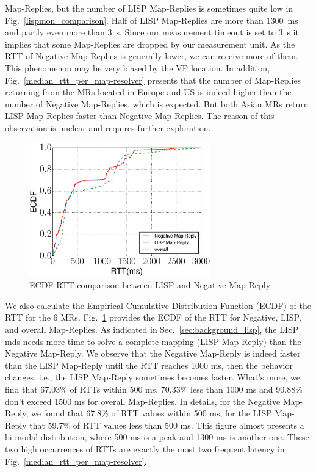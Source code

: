 Map-Replies, but the number of LISP Map-Replies is sometimes quite low in
Fig.~\ref{lispmon_comparison}. Half of LISP Map-Replies are more than 1300~ms
and partly even more than 3~s. Since our measurement timeout is set to 3~s
it implies that some Map-Replies are dropped by our measurement unit.  As the
RTT of Negative Map-Replies is generally lower, we can receive more of them. This
phenomenon may be very biased by the VP location. %
In addition, Fig.~\ref{median_rtt_per_map-resolver} presents that the number of
Map-Replies returning from the MRs  located in Europe and US is indeed higher
than the number of Negative Map-Replies, which is expected. But both Asian MRs
return LISP Map-Replies faster than Negative Map-Replies. The reason of this 
observation is unclear and requires further exploration.

\begin{figure}[!t]
        \centering
        \includegraphics[width=0.7\textwidth]{Pics/ecdf_of_RTT.eps}
        \caption{ECDF RTT comparison between LISP and Negative Map-Reply}
        \label{ecdf_rtt_lisp_negative}
\end{figure}
We also calculate the Empirical Cumulative Distribution Function (ECDF) of the
RTT for the 6 MRs. Fig.~\ref{ecdf_rtt_lisp_negative} provides the ECDF of the
RTT for Negative, LISP, and overall Map-Replies. As indicated in
Sec.~\ref{sec:background_lisp}, the LISP \acrshort{mds} needs more time to solve a
complete mapping (LISP Map-Reply) than the Negative Map-Reply.  We observe that
the Negative Map-Reply is indeed faster than the LISP Map-Reply until the RTT
reaches 1000 ms, then the behavior changes, i.e., the LISP Map-Reply
sometimes becomes faster. What's more, we find that 67.03\% of RTTs within
500 ms, 70.33\% less than 1000 ms and 90.88\% don't exceed 1500 ms
for overall Map-Replies. In details, for the Negative Map-Reply, we found that
67.8\% of RTT values within 500 ms, for the LISP Map-Reply that 59.7\% of
RTT values less than 500 ms. This figure almost presents a bi-modal
distribution, where 500 ms is a peak and 1300 ms is another one. These two
high occurrences of RTTs are exactly the most two frequent latency in
Fig.~\ref{median_rtt_per_map-resolver}.


